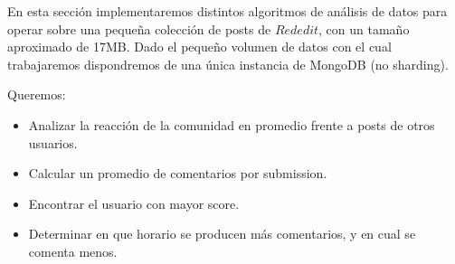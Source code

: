 En esta sección implementaremos distintos algoritmos de análisis de datos para operar sobre una peque\~na colección de posts de $Rededit$, con un tama\~no aproximado de 17MB. Dado el peque\~no volumen de datos con el cual trabajaremos dispondremos de una única instancia de MongoDB (no sharding).


Queremos:
\begin{itemize}
	\item Analizar la reacción de la comunidad en promedio frente a posts de otros usuarios.
	\item Calcular un promedio de comentarios por submission.
	\item Encontrar el usuario con mayor score.
	\item Determinar en que horario se producen más comentarios, y en cual se comenta menos.
\end{itemize}




